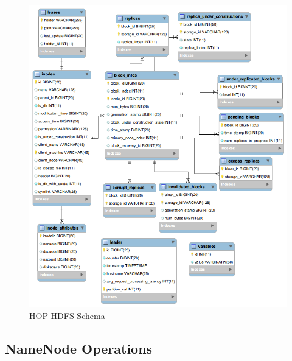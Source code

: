 \pagebreak
\begin{figure}[h!]
  \centering
 \includegraphics[scale=0.5]{figs/preliminar/HOP_HDFS_Schema.png}
  \caption{HOP-HDFS Schema}
  \label{fig:HDFS_table_schema}
\end{figure}




\subsection{NameNode Operations}

